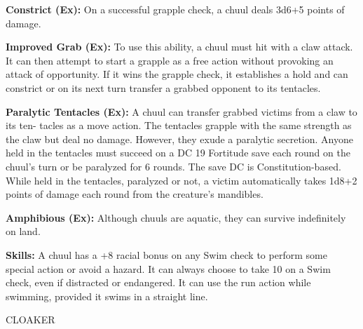 \documentclass{article}
\begin{document}
\textbf{Constrict (Ex): }On a successful grapple check, a chuul deals 3d6+5 points 
of damage.

\textbf{Improved Grab (Ex):} To use this ability, a chuul must hit with a claw 
attack. It can then attempt to start a grapple as a free action without provoking 
an attack of opportunity. If it wins the grapple check, it establishes a hold and 
can constrict or on its next turn transfer a grabbed opponent to its tentacles.

\textbf{Paralytic Tentacles (Ex):} A chuul can transfer grabbed victims from a 
claw to its ten- tacles as a move action. The tentacles grapple with the same strength 
as the claw but deal no damage. However, they exude a paralytic secretion. Anyone 
held in the tentacles must succeed on a DC 19 Fortitude save each round on the 
chuul's turn or be paralyzed for 6 rounds. The save DC is Constitution-based. While 
held in the tentacles, paralyzed or not, a victim automatically takes 1d8+2 points 
of damage each round from the creature's mandibles.

\textbf{Amphibious (Ex):} Although chuuls are aquatic, they can survive indefinitely 
on land.

\textbf{Skills:} A chuul has a +8 racial bonus on any Swim check to perform some 
special action or avoid a hazard. It can always choose to take 10 on a Swim check, 
even if distracted or endangered. It can use the run action while swimming, provided 
it swims in a straight line.

\vspace{12pt}
{\LARGE{}CLOAKER}
\end{document}
